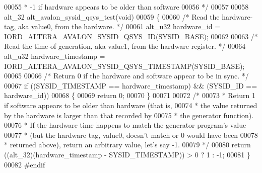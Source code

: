 \begin{DoxyCode}
00055 \textcolor{comment}{*   -1 if hardware appears to be older than software}
00056 \textcolor{comment}{*/}
00057 
00058 alt_32 alt\_avalon\_sysid\_qsys\_test(\textcolor{keywordtype}{void})
00059 \{
00060   \textcolor{comment}{/* Read the hardware-tag, aka value0, from the hardware. */}
00061   alt_u32 hardware\_id = IORD_ALTERA_AVALON_SYSID_QSYS_ID(SYSID\_BASE);
00062 
00063   \textcolor{comment}{/* Read the time-of-generation, aka value1, from the hardware register. */}
00064   alt_u32 hardware\_timestamp = IORD_ALTERA_AVALON_SYSID_QSYS_TIMESTAMP(SYSID\_BASE);
00065 
00066   \textcolor{comment}{/* Return 0 if the hardware and software appear to be in sync. */}
00067   \textcolor{keywordflow}{if} ((SYSID\_TIMESTAMP == hardware\_timestamp) && (SYSID\_ID == hardware\_id))
00068   \{
00069     \textcolor{keywordflow}{return} 0;
00070   \}
00071 
00072   \textcolor{comment}{/*}
00073 \textcolor{comment}{  *  Return 1 if software appears to be older than hardware (that is,}
00074 \textcolor{comment}{  *  the value returned by the hardware is larger than that recorded by}
00075 \textcolor{comment}{  *  the generator function).}
00076 \textcolor{comment}{  *  If the hardware time happens to match the generator program's value}
00077 \textcolor{comment}{  *  (but the hardware tag, value0, doesn't match or 0 would have been}
00078 \textcolor{comment}{  *  returned above), return an arbitrary value, let's say -1.}
00079 \textcolor{comment}{  */}
00080   \textcolor{keywordflow}{return} ((alt_32)(hardware\_timestamp - SYSID\_TIMESTAMP)) > 0 ? 1 : -1;
00081 \}
00082 \textcolor{preprocessor}{#endif}
\end{DoxyCode}
